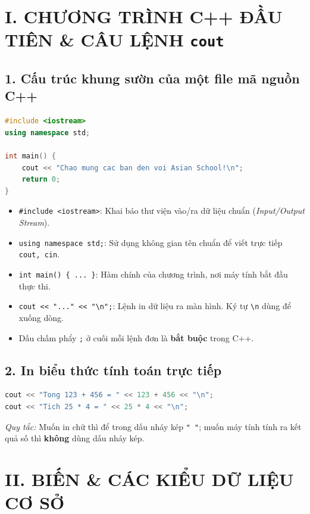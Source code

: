 \documentclass[11pt,a4paper]{article}
\begin{document}
\section*{\color{AsianDarkBlue}I. CHƯƠNG TRÌNH C++ ĐẦU TIÊN \& CÂU LỆNH \texttt{cout}}

\subsection*{\color{AsianBlue}1. Cấu trúc khung sườn của một file mã nguồn C++}
\begin{lstlisting}[language=C++]
#include <iostream>
using namespace std;

int main() {
    cout << "Chao mung cac ban den voi Asian School!\n";
    return 0;
}
\end{lstlisting}

\begin{itemize}
    \setlength{\itemsep}{1.5pt}
    \small
    \item \texttt{\#include <iostream>}: Khai báo thư viện vào/ra dữ liệu chuẩn (\textit{Input/Output Stream}).
    \item \texttt{using namespace std;}: Sử dụng không gian tên chuẩn để viết trực tiếp \texttt{cout, cin}.
    \item \texttt{int main() \{ ... \}}: Hàm chính của chương trình, nơi máy tính bắt đầu thực thi.
    \item \texttt{cout << "..." << "\textbackslash n";}: Lệnh in dữ liệu ra màn hình. Ký tự \texttt{\textbackslash n} dùng để xuống dòng.
    \item Dấu chấm phẩy \texttt{;} ở cuối mỗi lệnh đơn là \textbf{bắt buộc} trong C++.
\end{itemize}

\subsection*{\color{AsianBlue}2. In biểu thức tính toán trực tiếp}
\begin{lstlisting}[language=C++]
cout << "Tong 123 + 456 = " << 123 + 456 << "\n";
cout << "Tich 25 * 4 = " << 25 * 4 << "\n";
\end{lstlisting}
\textit{Quy tắc:} Muốn in chữ thì để trong dấu nháy kép \texttt{" "}; muốn máy tính tính ra kết quả số thì \textbf{không} dùng dấu nháy kép.

\newpage
\section*{\color{AsianDarkBlue}II. BIẾN \& CÁC KIỂU DỮ LIỆU CƠ SỞ}
\end{document}
